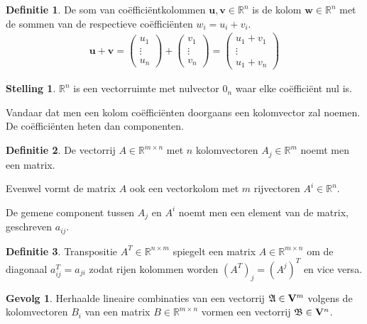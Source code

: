 \documentclass{amsart}
\theoremstyle{definition}
\newtheorem{thm}{Stelling}[section]
\newtheorem{dfn}{Definitie}[section]
\newtheorem{csq}{Gevolg}[section]
\newcommand{\realnums}{\mathbb{R}}
\newcommand{\realn}[1][n]{\realnums^{#1}}
\newcommand{\realmx}[2][n]{\realn[#2 \times #1]}
\newcommand{\realmxn}{\realmx{m}}
\newcommand{\vecspace}[1][v]{\mathrm{\mathbf{\MakeUppercase#1}}}
\newcommand{\vecspacen}[1][n]{\vecspace^#1}
\newcommand{\vvec}[1][v]{\mathbf{#1}}
\newcommand{\vecrow}[1][a]{\mathfrak{\MakeUppercase{#1}}}
\begin{document}
\begin{dfn}
    De som van coëfficiëntkolommen $\vvec[u], \vvec \in \realn$ is de kolom $\vvec[w] \in \realn$ met de sommen van de respectieve coëfficiënten ${w}_i = {u}_i + {v}_i$.
    \begin{align*}
        \vvec[u] + \vvec =
        \begin{pmatrix}
            u_1    \\
            \vdots \\
            u_n
        \end{pmatrix}
        +
        \begin{pmatrix}
            v_1    \\
            \vdots \\
            v_n
        \end{pmatrix}
        =
        \begin{pmatrix}
            u_1 + v_1 \\
            \vdots    \\
            u_1 + v_n
        \end{pmatrix}
    \end{align*}
\end{dfn}

\begin{thm}
    $\realn$ is een vectorruimte met nulvector $0_n$ waar elke coëfficiënt nul is.
\end{thm}

Vandaar dat men een kolom coëfficiënten doorgaans een kolomvector zal noemen. De coëfficiënten heten dan componenten.

\begin{dfn}
    De vectorrij $A \in \realn[m \times n]$ met $n$ kolomvectoren $A_{j} \in \realn[m]$ noemt men een matrix.

    Evenwel vormt de matrix $A$ ook een vectorkolom met $m$ rijvectoren $A^i \in \realn$.

    De gemene component tussen $A_j$ en $A^i$ noemt men een element van de matrix, geschreven $a_{ij}$.
\end{dfn}

\begin{dfn}
    Transpositie $A^T \in \realmx[m]{n}$ spiegelt een matrix $A \in \realmxn$ om de diagonaal $a^T_{ij} = a_{ji}$ zodat rijen kolommen worden $(A^T)_j = (A^j)^T$ en vice versa.
\end{dfn}

\begin{csq}
    Herhaalde lineaire combinaties van een vectorrij $\vecrow \in \vecspacen[m]$ volgens de kolomvectoren $B_i$ van een matrix $B \in \realmxn$ vormen een vectorrij $\vecrow[b] \in \vecspacen$.
\end{csq}
\end{document}
